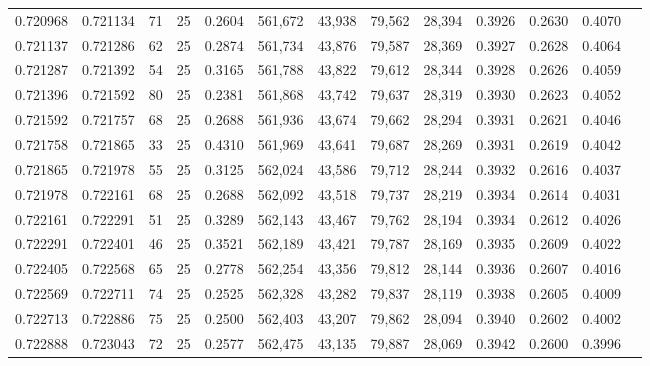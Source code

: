 \begin{tabular}{rrrrrrrrrrrrr}
0.720968 & 0.721134 &    71 &  25 &                                     0.2604 & 561,672 &  43,938 &  79,562 &  28,394 & 0.3926 & 0.2630 & 0.4070 \\
0.721137 & 0.721286 &    62 &  25 &                                     0.2874 & 561,734 &  43,876 &  79,587 &  28,369 & 0.3927 & 0.2628 & 0.4064 \\
0.721287 & 0.721392 &    54 &  25 &                                     0.3165 & 561,788 &  43,822 &  79,612 &  28,344 & 0.3928 & 0.2626 & 0.4059 \\
0.721396 & 0.721592 &    80 &  25 &                                     0.2381 & 561,868 &  43,742 &  79,637 &  28,319 & 0.3930 & 0.2623 & 0.4052 \\
0.721592 & 0.721757 &    68 &  25 &                                     0.2688 & 561,936 &  43,674 &  79,662 &  28,294 & 0.3931 & 0.2621 & 0.4046 \\
0.721758 & 0.721865 &    33 &  25 &                                     0.4310 & 561,969 &  43,641 &  79,687 &  28,269 & 0.3931 & 0.2619 & 0.4042 \\
0.721865 & 0.721978 &    55 &  25 &                                     0.3125 & 562,024 &  43,586 &  79,712 &  28,244 & 0.3932 & 0.2616 & 0.4037 \\
0.721978 & 0.722161 &    68 &  25 &                                     0.2688 & 562,092 &  43,518 &  79,737 &  28,219 & 0.3934 & 0.2614 & 0.4031 \\
0.722161 & 0.722291 &    51 &  25 &                                     0.3289 & 562,143 &  43,467 &  79,762 &  28,194 & 0.3934 & 0.2612 & 0.4026 \\
0.722291 & 0.722401 &    46 &  25 &                                     0.3521 & 562,189 &  43,421 &  79,787 &  28,169 & 0.3935 & 0.2609 & 0.4022 \\
0.722405 & 0.722568 &    65 &  25 &                                     0.2778 & 562,254 &  43,356 &  79,812 &  28,144 & 0.3936 & 0.2607 & 0.4016 \\
0.722569 & 0.722711 &    74 &  25 &                                     0.2525 & 562,328 &  43,282 &  79,837 &  28,119 & 0.3938 & 0.2605 & 0.4009 \\
0.722713 & 0.722886 &    75 &  25 &                                     0.2500 & 562,403 &  43,207 &  79,862 &  28,094 & 0.3940 & 0.2602 & 0.4002 \\
0.722888 & 0.723043 &    72 &  25 &                                     0.2577 & 562,475 &  43,135 &  79,887 &  28,069 & 0.3942 & 0.2600 & 0.3996 \\

\end{tabular}

